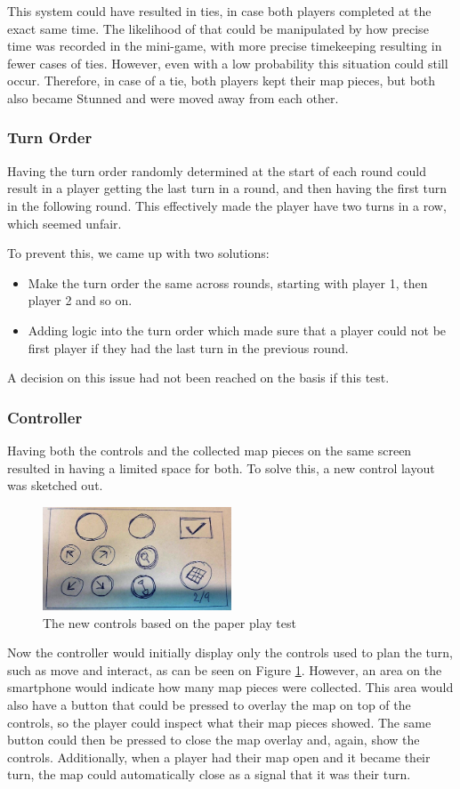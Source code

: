 This system could have resulted in ties, in case both players completed at the exact same time. The likelihood of that could be manipulated by how precise time was recorded in the mini-game, with more precise timekeeping resulting in fewer cases of ties. However, even with a low probability this situation could still occur. Therefore, in case of a tie, both players kept their map pieces, but both also became Stunned and were moved away from each other.

\subsubsection{Turn Order}
Having the turn order randomly determined at the start of each round could result in a player getting the last turn in a round, and then having the first turn in the following round. This effectively made the player have two turns in a row, which seemed unfair.


To prevent this, we came up with two solutions:
\begin{itemize}
\item Make the turn order the same across rounds, starting with player 1, then player 2 and so on.
\item Adding logic into the turn order which made sure that a player could not be first player if they had the last turn in the previous round.
\end{itemize}

A decision on this issue had not been reached on the basis if this test.

\subsubsection{Controller}
Having both the controls and the collected map pieces on the same screen resulted in having a limited space for both. To solve this, a new control layout was sketched out.

\begin{figure}[h]
\centering
\includegraphics[width=0.5\textwidth]{figures/RevisedControl} 
\caption{The new controls based on the paper play test}\label{fig:PPtest4}
\end{figure}

Now the controller would initially display only the controls used to plan the turn, such as move and interact, as can be seen on Figure \ref{fig:PPtest4}. However, an area on the smartphone would indicate how many map pieces were collected. This area would also have a button that could be pressed to overlay the map on top of the controls, so the player could inspect what their map pieces showed. The same button could then be pressed to close the map overlay and, again, show the controls. Additionally, when a player had their map open and it became their turn, the map could automatically close as a signal that it was their turn.


